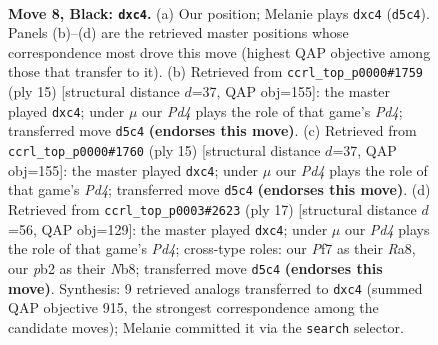 \documentclass[11pt]{article}
\begin{document}
\begin{figure}[p]\centering
\begin{subfigure}{0.46\textwidth}\centering
\resizebox{\linewidth}{!}{%
\newchessgame
\chessboard[
  setfen={rnbq1rk1/ppp2pp1/4pb1p/3p4/2PP3P/2N1PN2/PP3PP1/R2QKB1R b KQ - 0 8},
  showmover=false,
  pgfstyle=straightmove, color=movearrow, markmove={d5-c4}
]}
\caption{}
\end{subfigure}\hfill
\begin{subfigure}{0.46\textwidth}\centering
\resizebox{\linewidth}{!}{%
\newchessgame
\chessboard[
  setfen={rnbq1rk1/ppp2pp1/4pb1p/3p4/2PP4/2N1PN2/PP1Q1PPP/R3KB1R b KQ - 1 8},
  showmover=false,
  pgfstyle=straightmove, color=movearrow, markmove={d5-c4}
]}
\caption{}
\end{subfigure}
\\[4pt]
\begin{subfigure}{0.46\textwidth}\centering
\resizebox{\linewidth}{!}{%
\newchessgame
\chessboard[
  setfen={rnbq1rk1/ppp2pp1/4pb1p/3p4/2PP4/2N1PN2/PP1Q1PPP/R3KB1R b KQ - 1 8},
  showmover=false,
  pgfstyle=straightmove, color=movearrow, markmove={d5-c4}
]}
\caption{}
\end{subfigure}\hfill
\begin{subfigure}{0.46\textwidth}\centering
\resizebox{\linewidth}{!}{%
\newchessgame
\chessboard[
  setfen={rnbq1rk1/pp3pp1/2p1pb1p/3p4/2PP4/1QN1PN2/PP2BPPP/R3K2R b KQ - 1 9},
  showmover=false,
  pgfstyle=straightmove, color=movearrow, markmove={d5-c4}
]}
\caption{}
\end{subfigure}
\caption{\textbf{Move 8, Black: \texttt{dxc4}.} (a) Our position; Melanie plays \texttt{dxc4} (\texttt{d5c4}). Panels (b)--(d) are the retrieved master positions whose correspondence most drove this move (highest QAP objective among those that transfer to it). (b) Retrieved from \texttt{ccrl\_top\_p0000\#1759} (ply 15) [structural distance $d$=37, QAP obj=155]: the master played \texttt{dxc4}; under $\mu$ our \emph{Pd4} plays the role of that game's \emph{Pd4}; transferred move \texttt{d5c4} \textbf{(endorses this move)}. (c) Retrieved from \texttt{ccrl\_top\_p0000\#1760} (ply 15) [structural distance $d$=37, QAP obj=155]: the master played \texttt{dxc4}; under $\mu$ our \emph{Pd4} plays the role of that game's \emph{Pd4}; transferred move \texttt{d5c4} \textbf{(endorses this move)}. (d) Retrieved from \texttt{ccrl\_top\_p0003\#2623} (ply 17) [structural distance $d$=56, QAP obj=129]: the master played \texttt{dxc4}; under $\mu$ our \emph{Pd4} plays the role of that game's \emph{Pd4}; cross-type roles: our \emph{P}f7 as their \emph{R}a8, our \emph{p}b2 as their \emph{N}b8; transferred move \texttt{d5c4} \textbf{(endorses this move)}. Synthesis: 9 retrieved analogs transferred to \texttt{dxc4} (summed QAP objective 915, the strongest correspondence among the candidate moves); Melanie committed it via the \texttt{search} selector.}
\label{fig:thought-m15}
\end{figure}
\end{document}
